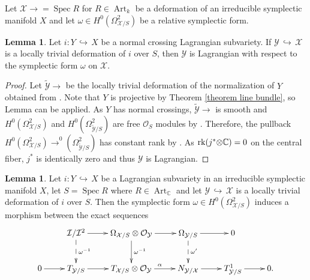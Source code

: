 \documentclass[a4paper,11pt,final]{amsart}
\theoremstyle{plain}
\theoremstyle{definition}
\newtheorem{lemma}[subsection]{Lemma}
\numberwithin{equation}{section}
\theoremstyle{remark}
\begin{document}
Let ${{\mathcal X}}{\xrightarrow{\ \ }}={\operatorname{Spec}} R$ for $R\in {\operatorname{Art}}_k$ be a deformation of an irreducible symplectic manifold $X$ and let $\omega\in H^0(\Omega^2_{{{\mathcal X}}/S})$ be a relative symplectic form.
\begin{lemma}\label{lemma deformation is lagrange}
Let $i:Y {{\, \hookrightarrow\,}} X$ be a normal crossing Lagrangian subvariety. If ${{\mathcal Y}}{{\, \hookrightarrow\,}} {{\mathcal X}}$ is a locally trivial deformation of $i$ over $S$, then ${{\mathcal Y}}$ is Lagrangian with respect to the symplectic form $\omega$ on ${{\mathcal X}}$.
\end{lemma}
\begin{proof}
Let ${{\widetilde{{\mathcal Y}}}}{\xrightarrow{\ \ }}$ be the locally trivial deformation of the normalization of $Y$ obtained from \cite[Lemma 4.5]{CL12}. Note that $Y$ is projective by Theorem \ref{theorem line bundle}, so Lemma \cite[Lemma 4.5]{CL12} can be applied. 
As $Y$ has normal crossings, ${{\widetilde{{\mathcal Y}}}}{\xrightarrow{\ \ }}$ is smooth and $H^0(\Omega^2_{{{\mathcal X}}/S})$ and $H^0(\Omega^2_{{{\widetilde{{\mathcal Y}}}}/S})$ are free ${{\mathcal O}}_S$ modules by \cite[Th\'eor\`eme 5.5]{De68}.
Therefore, the pullback $H^0(\Omega^2_{{{\mathcal X}}/S}){\xrightarrow{\ \ }}^0(\Omega^2_{{{\widetilde{{\mathcal Y}}}}/S})$ has constant rank by \cite[Theorem 4.17]{CL12}. As ${{\rm rk}} (j^*{\otimes}{{\mathbb C}})=0$ on the central fiber, $j^*$ is identically zero and thus ${{\mathcal Y}}$ is Lagrangian.
\end{proof}
\begin{lemma}\label{lemma two sequences}
Let $i:Y{{\, \hookrightarrow\,}} X$ be a Lagrangian subvariety in an irreducible symplectic manifold $X$, let $S={\operatorname{Spec}} R$ where $R\in {\operatorname{Art}}_{{\mathbb C}}$ and let ${{\mathcal Y}}{{\, \hookrightarrow\,}} {{\mathcal X}}$ is a locally trivial deformation of $i$ over $S$. Then the symplectic form $\omega\in H^0(\Omega^2_{{{\mathcal X}}/S})$ induces a morphism between the exact sequences 
\begin{equation}\label{omegat sequence}
\begin{xy}
\xymatrix{
& {{\mathcal I}}/{{\mathcal I}}^2 \ar[r] \ar@{-->}[d]^{\omega^{-1}}&  \Omega_{{{\mathcal X}}/S} \otimes {{\mathcal O}}_{{\mathcal Y}} \ar[r]\ar[d]^{\omega^{-1}}& \Omega_{{{\mathcal Y}}/S} \ar@{-->}[d]^{\omega'}\ar[r]& 0\\
0\ar[r] & T_{{{\mathcal Y}}/S} \ar[r]&  T_{{{\mathcal X}}/S} \otimes {{\mathcal O}}_{{\mathcal Y}} \ar[r]^\alpha & N_{{{\mathcal Y}}/{{\mathcal X}}} \ar[r]& T^1_{{{\mathcal Y}}/S} \ar[r]& 0.\\
}
\end{xy}
\end{equation}
\end{lemma}
\end{document}
